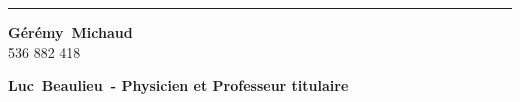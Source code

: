 \documentclass[12pt]{article} 	%
\newcommand\prenomStagiaire{Gérémy}
\newcommand\nomStagiaire{Michaud}
\newcommand\idul{536 882 418}
\newcommand\prenomSuperviseur{Luc}
\newcommand\nomSuperviseur{Beaulieu}
\newcommand\titreSuperviseur{Physicien et Professeur titulaire}
\begin{document}
\par\noindent\rule{\textwidth}{0.4pt}
\begin{minipage}[t]{6cm}
    \begin{flushleft}
        \textbf {\prenomStagiaire~\nomStagiaire}\\
        \idul
    \end{flushleft}
\end{minipage}
\begin{minipage}[t]{10cm}
    \begin{flushright}
        \hspace*{1cm}\textbf {\prenomSuperviseur~\nomSuperviseur~- \titreSuperviseur} \\
    \end{flushright}
\end{minipage}

\newpage
{}

\newpage
 


\newpage
\tableofcontents


\newpage
\listoftables


\newpage
\listoffigures


\newpage

\break


\newpage
{}




\newpage



\newpage



\newpage

\end{document}
